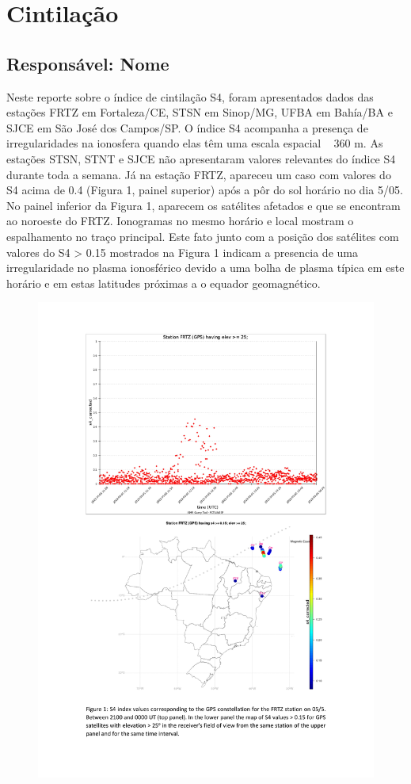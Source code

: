 \documentclass[a4paper, 10pt]{article}
\begin{document}
\section{Cintilação} 
 \subsection{Responsável: Nome} 
 
Neste reporte sobre o índice de cintilação S4, foram apresentados dados das 
estações FRTZ em Fortaleza/CE, STSN em Sinop/MG, UFBA em Bahía/BA e 
SJCE em São José dos Campos/SP. O índice S4 acompanha a presença de 
irregularidades na ionosfera quando elas têm uma escala espacial ~ 360 m.  
As estações STSN, STNT e SJCE não apresentaram valores relevantes do 
índice S4 durante toda a semana. Já na estação FRTZ, apareceu um caso com 
valores do S4 acima de 0.4 (Figura 1, painel superior) após a pôr do sol horário 
no dia 5/05. No painel inferior da Figura 1, aparecem os satélites afetados e que 
se encontram ao noroeste do FRTZ. Ionogramas no mesmo horário e local 
mostram o espalhamento no traço principal. Este fato junto com a posição dos 
satélites com valores do S4 > 0.15 mostrados na Figura 1 indicam a presencia 
de uma irregularidade no plasma ionosférico devido a uma bolha de plasma 
típica em este horário e em estas latitudes próximas a o equador geomagnético. 

    \begin{figure}[H]
        \centering
        \includegraphics[width=14cm]{./figures/pt_outfileScint_0.jpg}
    \end{figure} 
 
\end{document}
